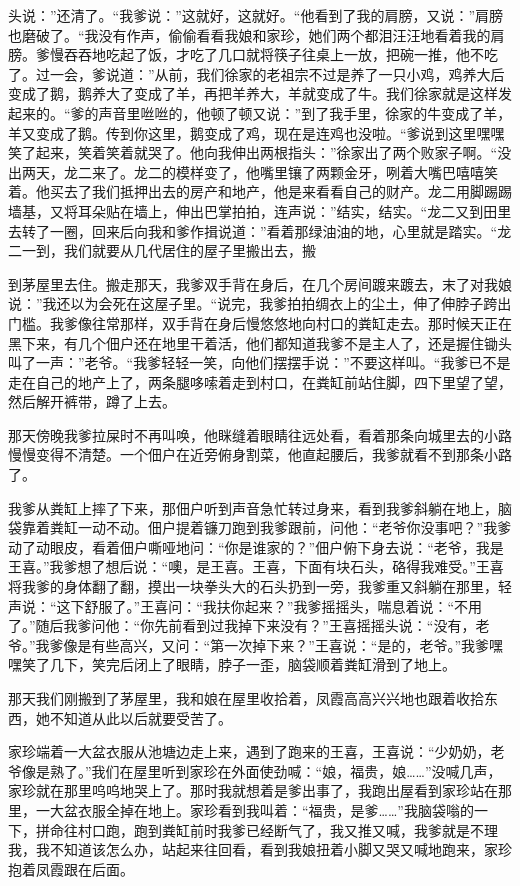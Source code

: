 \documentclass[12pt,UTF8]{ctexbook}
\begin{document}
头说：”还清了。“我爹说：”这就好，这就好。“他看到了我的肩膀，又说：”肩膀也磨破了。“我没有作声，偷偷看看我娘和家珍，她们两个都泪汪汪地看着我的肩膀。爹慢吞吞地吃起了饭，才吃了几口就将筷子往桌上一放，把碗一推，他不吃了。过一会，爹说道：”从前，我们徐家的老祖宗不过是养了一只小鸡，鸡养大后变成了鹅，鹅养大了变成了羊，再把羊养大，羊就变成了牛。我们徐家就是这样发起来的。“爹的声音里咝咝的，他顿了顿又说：”到了我手里，徐家的牛变成了羊，羊又变成了鹅。传到你这里，鹅变成了鸡，现在是连鸡也没啦。“爹说到这里嘿嘿笑了起来，笑着笑着就哭了。他向我伸出两根指头：”徐家出了两个败家子啊。“没出两天，龙二来了。龙二的模样变了，他嘴里镶了两颗金牙，咧着大嘴巴嘻嘻笑着。他买去了我们抵押出去的房产和地产，他是来看看自己的财产。龙二用脚踢踢墙基，又将耳朵贴在墙上，伸出巴掌拍拍，连声说：”结实，结实。“龙二又到田里去转了一圈，回来后向我和爹作揖说道：”看着那绿油油的地，心里就是踏实。“龙二一到，我们就要从几代居住的屋子里搬出去，搬


到茅屋里去住。搬走那天，我爹双手背在身后，在几个房间踱来踱去，末了对我娘说：”我还以为会死在这屋子里。“说完，我爹拍拍绸衣上的尘土，伸了伸脖子跨出门槛。我爹像往常那样，双手背在身后慢悠悠地向村口的粪缸走去。那时候天正在黑下来，有几个佃户还在地里干着活，他们都知道我爹不是主人了，还是握住锄头叫了一声：”老爷。“我爹轻轻一笑，向他们摆摆手说：”不要这样叫。“我爹已不是走在自己的地产上了，两条腿哆嗦着走到村口，在粪缸前站住脚，四下里望了望，然后解开裤带，蹲了上去。

那天傍晚我爹拉屎时不再叫唤，他眯缝着眼睛往远处看，看着那条向城里去的小路慢慢变得不清楚。一个佃户在近旁俯身割菜，他直起腰后，我爹就看不到那条小路了。

我爹从粪缸上摔了下来，那佃户听到声音急忙转过身来，看到我爹斜躺在地上，脑袋靠着粪缸一动不动。佃户提着镰刀跑到我爹跟前，问他：“老爷你没事吧？”我爹动了动眼皮，看着佃户嘶哑地问：“你是谁家的？”佃户俯下身去说：“老爷，我是王喜。”我爹想了想后说：“噢，是王喜。王喜，下面有块石头，硌得我难受。”王喜将我爹的身体翻了翻，摸出一块拳头大的石头扔到一旁，我爹重又斜躺在那里，轻声说：“这下舒服了。”王喜问：“我扶你起来？”我爹摇摇头，喘息着说：“不用了。”随后我爹问他：“你先前看到过我掉下来没有？”王喜摇摇头说：“没有，老爷。”我爹像是有些高兴，又问：“第一次掉下来？”王喜说：“是的，老爷。”我爹嘿嘿笑了几下，笑完后闭上了眼睛，脖子一歪，脑袋顺着粪缸滑到了地上。

那天我们刚搬到了茅屋里，我和娘在屋里收拾着，凤霞高高兴兴地也跟着收拾东西，她不知道从此以后就要受苦了。

家珍端着一大盆衣服从池塘边走上来，遇到了跑来的王喜，王喜说：“少奶奶，老爷像是熟了。”我们在屋里听到家珍在外面使劲喊：“娘，福贵，娘……”没喊几声，家珍就在那里呜呜地哭上了。那时我就想着是爹出事了，我跑出屋看到家珍站在那里，一大盆衣服全掉在地上。家珍看到我叫着：“福贵，是爹……”我脑袋嗡的一下，拼命往村口跑，跑到粪缸前时我爹已经断气了，我又推又喊，我爹就是不理我，我不知道该怎么办，站起来往回看，看到我娘扭着小脚又哭又喊地跑来，家珍抱着凤霞跟在后面。
\end{document}
